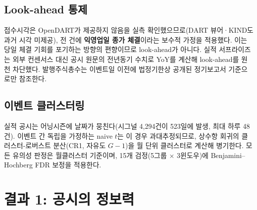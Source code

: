 \documentclass[11pt,a4paper]{article}
\newcommand{\sig}[1]{\textbf{#1}}
\begin{document}
\subsection{Look-ahead 통제}
접수시각은 OpenDART가 제공하지 않음을 실측 확인했으므로(DART 뷰어·KIND도 과거 시각 미제공),
전 건에 \sig{익영업일 종가 체결}이라는 보수적 가정을 적용했다. 이는 당일 체결 기회를 포기하는
방향의 편향이므로 look-ahead가 아니다. 실적 서프라이즈는 외부 컨센서스 대신 공시 원문의
전년동기 수치로 YoY를 계산해 look-ahead를 원천 차단했다. 발행주식총수는 이벤트일 이전에
법정기한상 공개된 정기보고서 기준으로만 참조한다.

\subsection{이벤트 클러스터링}
실적 공시는 어닝시즌에 날짜가 뭉친다(시그널 4{,}294건이 523일에 발생, 최대 하루 48건).
이벤트 간 독립을 가정하는 naive $t$는 이 경우 과대추정되므로, 상수항 회귀의 클러스터-로버스트
분산(CR1, 자유도 $G-1$)을 월 단위 클러스터로 계산해 병기한다. 모든 유의성 판정은 월클러스터
기준이며, 15개 검정(5그룹 $\times$ 3윈도우)에 Benjamini--Hochberg FDR 보정을 적용한다.

\section{결과 1: 공시의 정보력}
\end{document}
